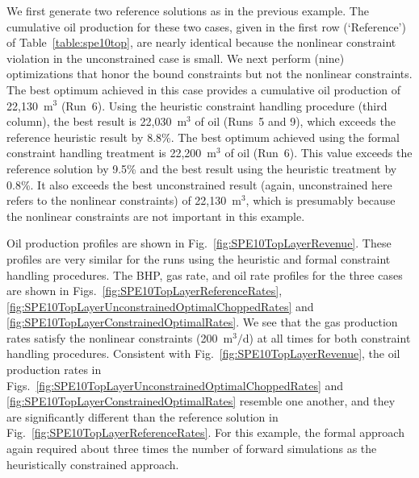 \documentclass[twocolumn,numbook]{svjour3}          %
\begin{document}
We first generate two reference solutions as in the previous example. The cumulative oil production for these two cases, given in the first row (`Reference') of Table~\ref{table:spe10top}, are nearly identical because the nonlinear constraint violation in the
unconstrained case is small. We next perform (nine) optimizations that honor the bound constraints but not the nonlinear constraints. The best optimum achieved in this case provides a cumulative oil production of 22,130~m$^3$ (Run~6). Using the heuristic constraint handling procedure (third column), the best result is 22,030~m$^3$ of oil (Runs~5 and 9), which
exceeds the reference heuristic result by 8.8\%. The best optimum achieved using the formal constraint handling treatment is 22,200~m$^3$ of oil (Run~6). This value exceeds the reference solution by 9.5\% and the best result using the heuristic treatment by 0.8\%. It also exceeds the best unconstrained result (again, unconstrained here refers to the nonlinear constraints) of 22,130~m$^3$, which is presumably because the nonlinear constraints are not important in this example.

Oil production profiles are shown in Fig.~\ref{fig:SPE10TopLayerRevenue}. These profiles are very similar for the runs using the heuristic and formal constraint handling procedures. The BHP, gas rate, and oil rate profiles for the three cases are shown in
Figs.~\ref{fig:SPE10TopLayerReferenceRates},
\ref{fig:SPE10TopLayerUnconstrainedOptimalChoppedRates} and
\ref{fig:SPE10TopLayerConstrainedOptimalRates}. We see that the gas production rates satisfy the nonlinear constraints (200~m$^3/$d) at all times for both constraint handling procedures. Consistent with Fig.~\ref{fig:SPE10TopLayerRevenue}, the oil production rates in Figs.~\ref{fig:SPE10TopLayerUnconstrainedOptimalChoppedRates} and
\ref{fig:SPE10TopLayerConstrainedOptimalRates} resemble one another, and they are significantly different than the reference solution in Fig.~\ref{fig:SPE10TopLayerReferenceRates}. For this example, the formal approach again required about three times the number of forward
simulations as the heuristically constrained approach.
\end{document}
